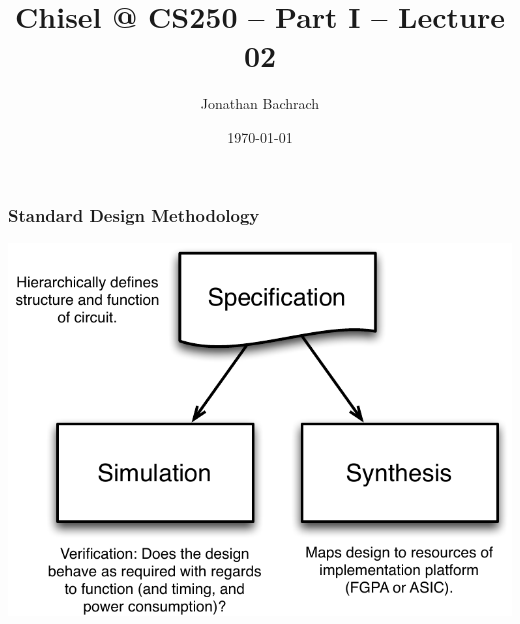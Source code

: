 \documentclass[xcolor=pdflatex,dvipsnames,table]{beamer}
\title{Chisel @ CS250 -- Part I -- Lecture 02}
\author{Jonathan Bachrach}
\date{\today}
\institute[UC Berkeley]{EECS UC Berkeley}
\begin{document}
\begin{frame}
\titlepage
\end{frame}
\addtocounter{framenumber}{-1}

% 
% 
% 

\begin{frame}
\frametitle{Standard Design Methodology}
\begin{center}
\includegraphics[height=0.9\textheight]{figs/design.pdf}
\end{center}
\end{frame}
\end{document}
